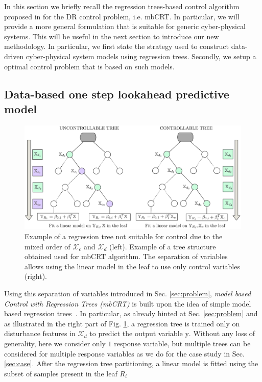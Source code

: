 \textcolor[rgb]{0.00,0.00,1.00}{In this section we briefly recall the regression trees-based control algorithm proposed in \cite{Behl201630} for the DR control problem, i.e. mbCRT. In particular, we will provide a more general formulation that is suitable for generic cyber-physical systems. This will be useful in the next section to introduce our new methodology. In particular, we first state the strategy used to construct data-driven cyber-physical system models using regression trees. Secondly, we setup a optimal control problem that is based on such models.}

\subsection{Data-based one step lookahead predictive model}
\label{sec:mbcrt}

\begin{figure}
\centering
\includegraphics[width=0.95\columnwidth]{Figures/sep_vars.eps}
   \caption{Example of a regression tree not suitable for control due to the mixed order of $\mathcal{X}_c$ and $\mathcal{X}_d$ (left). Example of a tree structure obtained used for mbCRT algorithm. The separation of variables allows using the linear model in the leaf to use only control variables (right).}
   \captionsetup{justification=centering}
   \label{fig:training}
\end{figure}

\textcolor[rgb]{0.00,0.00,1.00}{Using this separation of variables introduced in Sec. \ref{sec:problem}, \emph{model based Control with Regression Trees (mbCRT)} is built upon the idea of simple model based regression trees~\cite{friedman1991multivariate}. In particular, as already hinted at Sec. \ref{sec:problem} and as illustrated in the right part of Fig. \ref{fig:training}, a regression tree is trained only on disturbance features in $\mathcal{X}_d$ to predict the output variable $\mathrm{y}$. Without any loss of generality, here we consider only $1$ response variable, but multiple trees can be considered for multiple response variables as we do for the case study in Sec. \ref{sec:case}. After the regression tree partitioning, a linear model is fitted using the subset of samples present in the leaf $R_i$}

